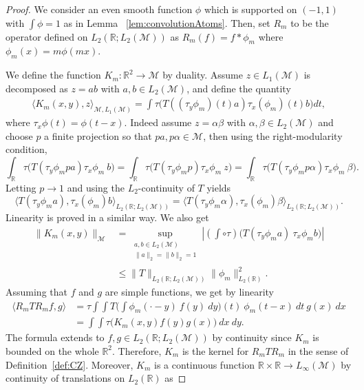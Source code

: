 \documentclass[10pt,a4paper]{amsart}
\newcommand{\Linfty}{L_\infty}
\newcommand{\Lone}{L_1}
\newcommand{\Ltwo}{L_2}
\newcommand{\R}{\mathbb{R}}
\newcommand{\la}{\langle}
\begin{document}
    \begin{proof} 
    We consider an even smooth function $\phi$ which is supported on $(-1,1)$ with
      $\int \phi = 1$ as in Lemma ~\ref{lem:convolutionAtoms}. Then, set $R_m$ to be the operator defined on
      $\Ltwo(\mathbb{R};\Ltwo(\mathcal{M}))$ as $R_m(f) = f * \phi_m$
      where $\phi_m(x) = m \phi(mx)$.
    
      We define the function $K_m:\R^2\to \mathcal M$ by duality. Assume
        $z\in \Lone(\mathcal M)$ is decomposed as $z=ab$ with $a,b\in \Ltwo(\mathcal M)$, and define the quantity 
      \begin{align}\label{formulaKm}
        \la K_m(x,y),z\rangle_{\mathcal M,\Lone(\mathcal M)}  =
        \int \tau\big(T((\tau_y\phi_m)(t)a)\tau_x ({\phi}_m)(t)b\big) dt,
      \end{align}
      where $\tau_x \phi(t) = \phi(t-x)$. Indeed assume $z=\alpha\beta$ with $\alpha,\beta\in \Ltwo(\mathcal M)$ and choose $p$ a
      finite projection so that $pa, p\alpha\in \mathcal M$, then using the right-modularity condition,
      $$\int_\R \tau\big(T(\tau_y\phi_mpa)\tau_x{\phi}_m \ b\big)= \int_\R \tau\big(T(\tau_y\phi_m p)\tau_x \phi_m \ z\big)=\int_\R \tau\big(T(\tau_y\phi_m p\alpha)\tau_x\phi_m \ \beta\big).$$
      Letting $p\to 1$ and using the $L_2$-continuity of $T$ yields
      $$\langle T(\tau_y\phi_ma), \tau_x ({\phi}_m)b \rangle_{\Ltwo(\R;\Ltwo(\mathcal M))}=\langle T(\tau_y\phi_m\alpha), \tau_x ({\phi}_m)\beta \rangle_{\Ltwo(\R;\Ltwo(\mathcal M))}.$$      
      Linearity is proved in a similar way. We also get
      \begin{align*}
            \|K_m(x,y)\|_{\mathcal{M}} &= \sup_{\substack{{a,b\in \Ltwo(\mathcal M)}\\ \|a\|_2=\|b\|_2=1}} | (\int \circ \tau) \big(T(\tau_y \phi_ma)  \ \tau_x {\phi}_m  b \big) | \\
            &\leq \|T\|_{\Ltwo(\R;\Ltwo(\mathcal M))}  \| \phi_m\|_{\Ltwo(\mathbb{R})}^2.
        \end{align*}
        Assuming that $f$ and $g$ are simple functions, we get by linearity 
\begin{align*}
  \langle R_m T R_m f , g \rangle &= \tau \int \int T\Big(\int \phi_m(\cdot-y) \ f(y) \ dy\Big)(t) \ \phi_m(t-x) \ dt \ g(x) \ dx\\
  &= \int\int \tau\big(K_m(x,y)f(y)g(x)\big) \ dx \ dy.
\end{align*}
The formula extends to $f,g\in \Ltwo(\R;\Ltwo(\mathcal M))$ by continuity since $K_m$ is bounded on the whole $\R^2$. Therefore, $K_m$ is the kernel for $R_m T R_m$ in the sense of Definition~\ref{def:CZ}. Moreover, $K_m$ is a continuous function $\R\times\R \to \Linfty(\mathcal M)$ by continuity of translations on $\Ltwo(\R)$ as

\end{proof}
\end{document}
